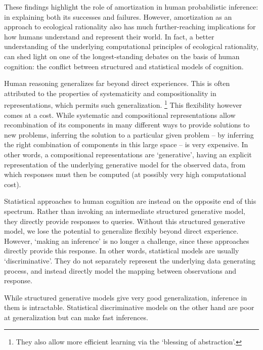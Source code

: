 These findings highlight the role of amortization in human probabilistic inference: in explaining both its successes and failures. However, amortization as an approach to ecological rationality also has much further-reaching implications for how humans understand and represent their world. In fact, a better understanding of the underlying computational principles of ecological rationality, can shed light on one of the longest-standing debates on the basis of human cognition: the conflict between structured and statistical models of cognition.

Human reasoning generalizes far beyond direct experiences\citep{griffiths2006, shepard1987toward, wu2018generalization, schulz2017compositional}. This is often attributed to the properties of systematicity and compositionality\citep{fodor88} in representations, which permits such generalization. \footnote{They also allow more efficient learning via the `blessing of abstraction'\citep{harlow1949formation, kemp2007learning, goodman1983fact}.} This flexibility however comes at a cost. While systematic and compositional representations allow recombination of its components in many different ways to provide solutions to new problems, inferring the solution to a particular given problem – by inferring the right combination of components in this large space – is very expensive. In other words, a compositional representations are `generative', having an explicit representation of the underlying generative model for the observed data, from which responses must then be computed (at possibly very high computational cost).

Statistical approaches to human cognition are instead on the opposite end of this spectrum. Rather than invoking an intermediate structured generative model, they directly provide responses to queries. Without this structured generative model, we lose the potential to generalize flexibly beyond direct experience. However, `making an inference' is no longer a challenge, since these approaches directly provide this response. In other words, statistical models are usually `discriminative'. They do not separately represent the underlying data generating process, and instead directly model the mapping between observations and response.

While structured generative models give very good generalization, inference in them is intractable. Statistical discriminative models on the other hand are poor at generalization but can make fast inferences.


